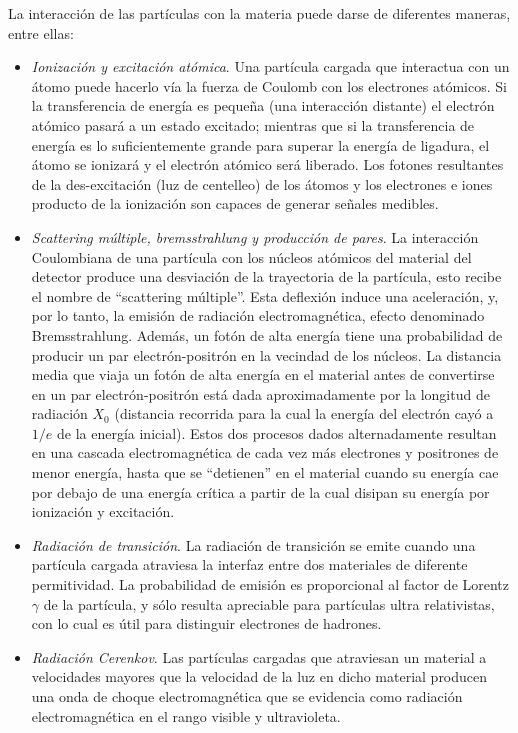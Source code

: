 La interacción de las partículas con la materia puede darse de diferentes maneras, entre ellas\cite{Instrumentation}:
\begin{itemize}

\item \emph{Ionización y excitación atómica}. Una partícula cargada que interactua con un átomo puede hacerlo vía la fuerza de Coulomb con los electrones atómicos.
Si la transferencia de energía es pequeña (una interacción distante) el electrón atómico pasará a un estado excitado; mientras que si la transferencia de energía es lo suficientemente grande para superar la energía de ligadura, el átomo se ionizará y el electrón atómico será liberado. Los fotones resultantes de la des-excitación (luz de centelleo) de los átomos y los electrones e iones producto de la ionización son capaces de generar señales medibles.
\item \emph{Scattering múltiple, bremsstrahlung y producción de pares}. La interacción Coulombiana de una partícula con los núcleos atómicos del material del detector produce una desviación de la trayectoria de la partícula, esto recibe el nombre de ``scattering múltiple''. Esta deflexión induce una aceleración, y, por lo tanto, la emisión de radiación electromagnética, efecto denominado Bremsstrahlung. Además, un fotón de alta energía tiene una probabilidad de producir un par electrón-positrón en la vecindad de los núcleos. La distancia media que viaja un fotón de alta energía en el material antes de convertirse en un par electrón-positrón está dada aproximadamente por la longitud de radiación $X_0$ (distancia recorrida para la cual la energía del electrón cayó a $1/e$ de la energía inicial). Estos dos procesos dados alternadamente resultan en una cascada electromagnética de cada vez más electrones y positrones de menor energía, hasta que se ``detienen'' en el material cuando su energía cae por debajo de una energía crítica a partir de la cual disipan su energía por ionización y excitación.
\item \emph{Radiación de transición}. La radiación de transición se emite cuando una partícula cargada atraviesa la interfaz entre dos materiales de diferente permitividad. La probabilidad de emisión es proporcional al factor de Lorentz $\gamma$ de la partícula, y sólo resulta apreciable para partículas ultra relativistas, con lo cual es útil para distinguir electrones de hadrones. 
\item \emph{Radiación Cerenkov}. Las partículas cargadas que atraviesan un material a velocidades mayores que la velocidad de la luz en dicho material producen una onda de choque electromagnética que se evidencia como radiación electromagnética en el rango visible y ultravioleta.
\end{itemize}

